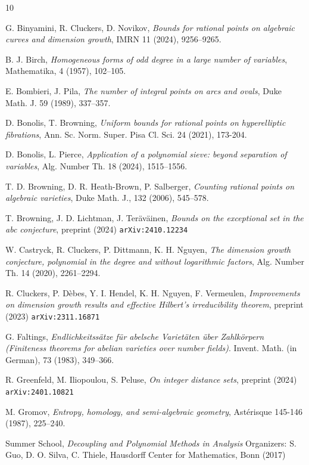 \documentclass[12pt]{amsart}
\newcommand{\1}{{\mathbf 1}}
\theoremstyle{remark}
\theoremstyle{definition}
\begin{document}

\begin{thebibliography}{10}

 G. Binyamini, R. Cluckers, D. Novikov,
{\it Bounds for rational points on algebraic curves and dimension growth}, IMRN 11 (2024),
9256--9265.

 B. J. Birch, {\it Homogeneous forms of odd degree in a large number of variables}, Mathematika, 4 (1957), 102--105.

 E. Bombieri, J. Pila, {\it The number of integral points on arcs and ovals}, Duke Math. J. 59 (1989), 337--357.

 D. Bonolis, T. Browning, {\it Uniform bounds for rational points on hyperelliptic fibrations}, Ann. Sc. Norm. Super. Pisa Cl. Sci. 24 (2021), 173-204. 

 D. Bonolis, L. Pierce, {\it Application of a polynomial sieve: beyond separation of variables},  Alg. Number Th. 18 (2024), 1515--1556.

 T. D. Browning, D. R. Heath-Brown, P. Salberger, {\it Counting rational points on algebraic varieties}, Duke Math. J., 132 (2006), 545--578.

 T. Browning, J. D. Lichtman, J. Ter\"av\"ainen, {\it Bounds on the exceptional set in the abc conjecture}, preprint (2024) {\tt arXiv:2410.12234}


 W. Castryck, R. Cluckers, P. Dittmann, K. H. Nguyen,
{\it The dimension growth conjecture, polynomial in the degree and without logarithmic factors}, Alg. Number Th. 14 (2020),  2261--2294.

 R. Cluckers, P. D\`ebes, Y. I. Hendel, K. H. Nguyen, F. Vermeulen,
{\it Improvements on dimension growth results and effective Hilbert's irreducibility theorem}, preprint (2023) {\tt arXiv:2311.16871}

 G. Faltings, {\it Endlichkeitss\"atze f\"ur abelsche Variet\"aten \"uber Zahlk\"orpern (Finiteness theorems for abelian varieties over number fields)}. Invent. Math. (in German), 73 (1983), 349--366.

 R. Greenfeld, M. Iliopoulou, S. Peluse, {\it On integer distance sets}, preprint (2024) {\tt arXiv:2401.10821}

 M. Gromov, {\it Entropy, homology, and semi-algebraic geometry}, Ast\'{e}risque 145-146 (1987), 225--240.

 Summer School, {\it Decoupling and Polynomial Methods in Analysis} Organizers: S. Guo, D. O. Silva, C. Thiele, Hausdorff Center for Mathematics, Bonn (2017)


\end{thebibliography}
\end{document}
